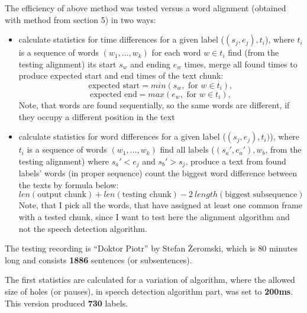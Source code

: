 \documentclass[12pt,a4paper,english]{article}
\begin{document}
The efficiency of above method was tested versus a word alignment (obtained with method from section 5) in two ways:
\begin{itemize}
    \item calculate statistics for time differences 
          \subitem for a given label ($(s_j, e_j), t_i$), where $t_i$ is a sequence of words $(w_1, ..., w_k)$
          \subitem for each word $w \in t_i$ find (from the testing alignment) its start $s_{w}$ and ending $e_{w}$ times,
          \subitem merge all found times to produce expected start and end times of the text chunk:
            \begin{equation}
                \text{expected start} = min(s_{w}, \text{ for } w \in t_i),
            \end{equation}
            \begin{equation}
                \text{expected end} = max(e_{w}, \text{ for } w \in t_i),
            \end{equation}
          \subitem Note, that words are found sequentially, so the same words are different, if they occupy a different position in the text
    \item calculate statistics for word differences
          \subitem for a given label ($(s_j, e_j), t_i)$), where $t_i$ is a sequence of words $(w_1, ..., w_k)$
          \subitem find all labels ($(s_a', e_a'), w_b$, from the testing alignment) where $s_a' < e_j$ and $s_b' > s_j$,
          \subitem produce a text from found labels' words (in proper sequence)
          \subitem count the biggest word difference between the texts by formula below:
          \begin{equation}
               len(\text{output chunk}) + len(\text{testing chunk}) - 2 \: length(\text{biggest subsequence})
          \end{equation}
          \subitem Note, that I pick all the words, that have assigned at least one common frame with a tested chunk, since I want to test here the alignment algorithm and not the speech detection algorithm.
\end{itemize}
The testing recording is “Doktor Piotr” by Stefan Żeromski, which is 80 minutes long and consists \textbf{1886} sentences (or subsentences). \newline

\newpage

The first statistics are calculated for a variation of algorithm, where the allowed size of holes (or pauses), in speech detection algorithm part,
was set to \textbf{200ms}. This version produced \textbf{730} labels. \newline
\end{document}
